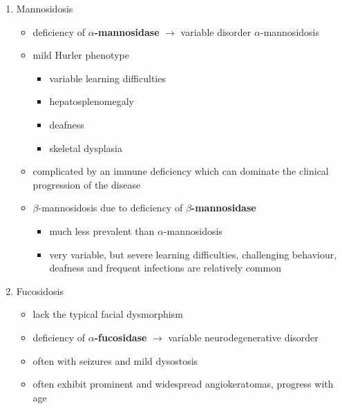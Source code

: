 \documentclass[12pt]{scrartcl}
\begin{document}
\begin{enumerate}
\item Mannosidosis
\label{sec:org0682a53}
\begin{itemize}
\item deficiency of \textbf{\(\alpha\)-mannosidase} \(\to\) variable disorder \(\alpha\)-mannosidosis
\item mild Hurler phenotype
\begin{itemize}
\item variable learning difficulties
\item hepatosplenomegaly
\item deafness
\item skeletal dysplasia
\end{itemize}
\item complicated by an immune deficiency which can dominate the clinical
progression of the disease

\item \(\beta\)-mannosidosis due to deficiency of \textbf{\(\beta\)-mannosidase}
\begin{itemize}
\item much less prevalent than \(\alpha\)-mannosidosis
\item very variable, but severe learning difficulties, challenging
behaviour, deafness and frequent infections are relatively common
\end{itemize}
\end{itemize}

\item Fucosidosis
\label{sec:org9bb1357}
\begin{itemize}
\item lack the typical facial dysmorphism
\item deficiency of \textbf{\(\alpha\)-fucosidase} \(\to\) variable neurodegenerative disorder
\item often with seizures and mild dysostosis
\item often exhibit prominent and widespread angiokeratomas, progress with age
\end{itemize}


\end{enumerate}
\end{document}
